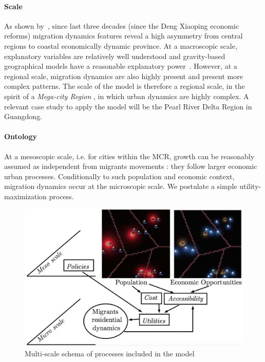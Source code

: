 \paragraph{Scale} As shown by~\cite{chan2012migration}, since last three decades (since the Deng Xiaoping economic reforms) migration dynamics features reveal a high asymmetry from central regions to coastal economically dynamic province. At a macroscopic scale, explanatory variables are relatively well understood and gravity-based geographical models have a reasonable explanatory power~\cite{fan2005modeling}. However, at a regional scale, migration dynamics are also highly present and present more complex patterns. The scale of the model is therefore a regional scale, in the spirit of a \emph{Mega-city Region} \cite{hall2006polycentric}, in which urban dynamics are highly complex. A relevant case study to apply the model will be the Pearl River Delta Region in Guangdong.

\paragraph{Ontology} At a mesoscopic scale, i.e. for cities within the MCR, growth can be reasonably assumed as independent from migrants movements : they follow larger economic urban processes. Conditionally to such population and economic context, migration dynamics occur at the microscopic scale. We postulate a simple utility-maximization process.


\begin{figure}
\centering
\includegraphics[width=\textwidth]{figures/model}
\caption{Multi-scale schema of processes included in the model}
\label{fig:model}
\end{figure}



